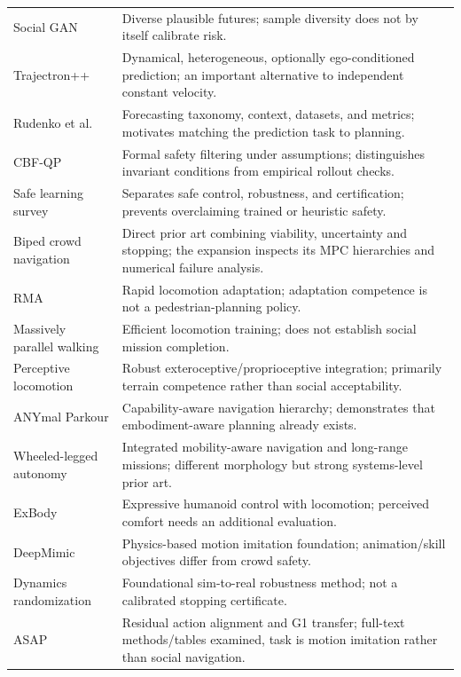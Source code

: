 \documentclass[11pt,a4paper]{article}
\begin{document}
\begin{longtable}{P{0.28\textwidth}P{0.65\textwidth}}
Social GAN \citep{socialgan} & Diverse plausible futures; sample diversity does not by itself calibrate risk. \\
Trajectron++ \citep{trajectron} & Dynamical, heterogeneous, optionally ego-conditioned prediction; an important alternative to independent constant velocity. \\
Rudenko et al. \citep{prediction} & Forecasting taxonomy, context, datasets, and metrics; motivates matching the prediction task to planning. \\
CBF-QP \citep{cbf} & Formal safety filtering under assumptions; distinguishes invariant conditions from empirical rollout checks. \\
Safe learning survey \citep{safecontrol} & Separates safe control, robustness, and certification; prevents overclaiming trained or heuristic safety. \\
Biped crowd navigation \citep{biped2016} & Direct prior art combining viability, uncertainty and stopping; the expansion inspects its MPC hierarchies and numerical failure analysis. \\
RMA \citep{rma} & Rapid locomotion adaptation; adaptation competence is not a pedestrian-planning policy. \\
Massively parallel walking \citep{rudin} & Efficient locomotion training; does not establish social mission completion. \\
Perceptive locomotion \citep{rough} & Robust exteroceptive/proprioceptive integration; primarily terrain competence rather than social acceptability. \\
ANYmal Parkour \citep{parkour} & Capability-aware navigation hierarchy; demonstrates that embodiment-aware planning already exists. \\
Wheeled-legged autonomy \citep{wheeledleg} & Integrated mobility-aware navigation and long-range missions; different morphology but strong systems-level prior art. \\
ExBody \citep{expressive} & Expressive humanoid control with locomotion; perceived comfort needs an additional evaluation. \\
DeepMimic \citep{deepmimic} & Physics-based motion imitation foundation; animation/skill objectives differ from crowd safety. \\
Dynamics randomization \citep{domain} & Foundational sim-to-real robustness method; not a calibrated stopping certificate. \\
ASAP \citep{asap} & Residual action alignment and G1 transfer; full-text methods/tables examined, task is motion imitation rather than social navigation. \\

\end{longtable}
\end{document}
